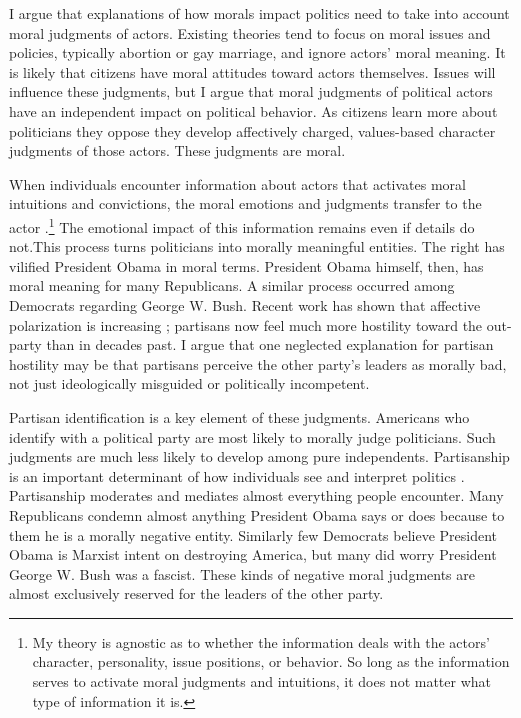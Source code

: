 I argue that explanations of how morals impact politics need to take into account moral judgments of actors. Existing theories tend to focus on moral issues and policies, typically abortion or gay marriage, and ignore actors' moral meaning. It is likely that citizens have moral attitudes toward actors themselves. Issues will influence these judgments, but I argue that moral judgments of political actors have an independent impact on political behavior. As citizens learn more about politicians they oppose they develop affectively charged, values-based character judgments of those actors. These judgments are moral.

When individuals encounter information about actors that activates moral intuitions and convictions, the moral emotions and judgments transfer to the actor \cite{LodgeSteenbergenBrau1995}.\footnote{My theory is agnostic as to whether the information deals with the actors' character, personality, issue positions, or behavior. So long as the information serves to activate moral judgments and intuitions, it does not matter what type of information it is.} The emotional impact of this information remains even if details do not.This process turns politicians into morally meaningful entities. The right has vilified President Obama in moral terms. President Obama himself, then, has moral meaning for many Republicans. A similar process occurred among Democrats regarding George W. Bush. Recent work has shown that affective polarization is increasing \cite{Iyengaretal2012}; partisans now feel much more hostility toward the out-party than in decades past. I argue that one neglected explanation for partisan hostility may be that partisans perceive the other party's leaders as morally bad, not just ideologically misguided or politically incompetent.

Partisan identification is a key element of these judgments. Americans who identify with a political party are most likely to morally judge politicians. Such judgments are much less likely to develop among pure independents. Partisanship is an important determinant of how individuals see and interpret politics \cite{Bartels2002b,GreenPalmquistSchickler2002,Rahn1993}. Partisanship moderates and mediates almost everything people encounter. Many Republicans condemn almost anything President Obama says or does because to them he is a morally negative entity. Similarly few Democrats believe President Obama is Marxist intent on destroying America, but many did worry President George W. Bush was a fascist. These kinds of negative moral judgments are almost exclusively reserved for the leaders of the other party.

